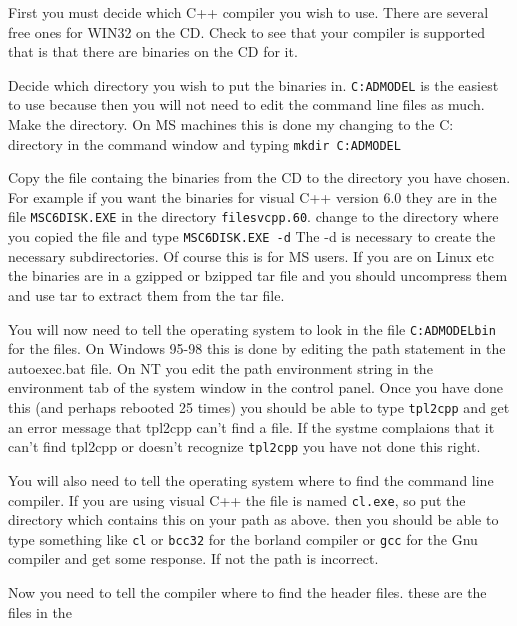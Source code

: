 \documentclass[12pt]{book}
\begin{document}
\begin{list}{}{}
\item First you must decide which C++ compiler you wish to use.
There are several free ones for WIN32 on the \ADMS CD. Check to see
that your compiler is supported that is that there are \ADMS
binaries on the CD for it.
\item Decide which directory you wish to put the \ADMS
binaries in. {\tt C:\mybackslash ADMODEL} is the easiest to use
because then you will not need to edit the command line
files as much.  Make the directory. On MS machines this is
done my changing to the C: directory in the command window
and typing {\tt mkdir C:\mybackslash ADMODEL}
\item Copy the file containg the \ADMS binaries from the
CD to the directory you have chosen. For example if you want the
binaries for visual C++ version 6.0 they are in the file
{\tt MSC6DISK.EXE} in the directory {\tt \mybackslash files\mybackslash vcpp.60}.
change to the directory where you copied the file and type
{\tt MSC6DISK.EXE -d} The -d is necessary to create the
necessary subdirectories. Of course this is for MS users. If you
are on Linux etc the binaries are in a gzipped or bzipped tar file 
and you should uncompress them and use tar to extract them from the tar file. 
\item You will now need to tell the operating system to look in the
file {\tt C:\mybackslash ADMODEL\mybackslash bin} for the
\ADMS files. On Windows 95-98 this is done by editing the
path statement in the autoexec.bat file. On NT you edit
the path environment string in the environment tab of the
system window in the control panel. Once you have done this
(and perhaps rebooted 25 times) you should be able to 
type {\tt tpl2cpp} and get an error message that tpl2cpp can't find
a file. If the systme complaions that it can't find tpl2cpp
or doesn't recognize {\tt tpl2cpp} you have not done this right.
\item  You will also need to tell the operating system
where to find the command line compiler. If you are using
visual C++ the file is named {\tt cl.exe}, so put the
directory which contains this on your path as above.
then you should be able to type something like {\tt cl}
or {\tt bcc32} for the borland compiler or {\tt gcc}
for the Gnu compiler and get some response. If not
the path is incorrect.  
\item   Now you need to tell the compiler where to find
the \ADMS header files. these are the files in the

\end{list}
\end{document}

